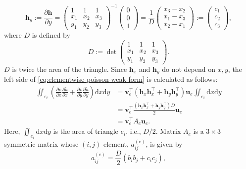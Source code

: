 \begin{equation}\label{eq:triangle-shape-y-derivative}
\boldsymbol{h}_y:=\frac{\partial\boldsymbol{h}}{\partial y}
=\begin{pmatrix}1&1&1\\x_1&x_2&x_3\\y_1&y_2&y_3\end{pmatrix}^{-1}\begin{pmatrix}0\\0\\1\end{pmatrix}
=\frac1D\begin{pmatrix}x_3-x_2\\x_1-x_3\\x_2-x_1\end{pmatrix}:=\begin{pmatrix}c_1\\c_2\\c_3\end{pmatrix},
\end{equation}
{where $D$ is defined by}
\[D:=\det\begin{pmatrix}1&1&1\\x_1&x_2&x_3\\y_1&y_2&y_3\end{pmatrix}.\]
{$D$ is twice the area of the triangle. Since $\boldsymbol{h}_x$ and $\boldsymbol{h}_y$ do not depend on $x,y$, the left side of \eqref{eq:elementwise-poisson-weak-form} is calculated as follows:}
\[\begin{aligned}
\iint_{e_i}\left(\frac{\partial v}{\partial x}\frac{\partial\widetilde u}{\partial x}+\frac{\partial v}{\partial y}\frac{\partial\widetilde u}{\partial y}\right)\mathrm dx\mathrm dy
&=\boldsymbol{v}_e^{\top}(\boldsymbol{h}_x\boldsymbol{h}_x^{\top}+\boldsymbol{h}_y\boldsymbol{h}_y^{\top})\boldsymbol{u}_e\iint_{e_i}\mathrm dx\mathrm dy\\
&=\boldsymbol{v}_e^{\top}\frac{(\boldsymbol{h}_x\boldsymbol{h}_x^{\top}+\boldsymbol{h}_y\boldsymbol{h}_y^{\top})D}{2}\boldsymbol{u}_e\\
&=\boldsymbol{v}_e^{\top}A_e\boldsymbol{u}_e.
\end{aligned}\]
{Here, $\iint_{e_i}\mathrm dx\mathrm dy$ is the area of triangle $e_i$, i.e., $D/2$. Matrix $A_e$ is a $3\times3$ symmetric matrix whose $(i,j)$ element, $a_{ij}^{(e)}$, is given by}
\begin{equation}\label{eq:element-stiffness-entry}
a_{ij}^{(e)}=\frac D2(b_ib_j+c_ic_j),
\end{equation}
